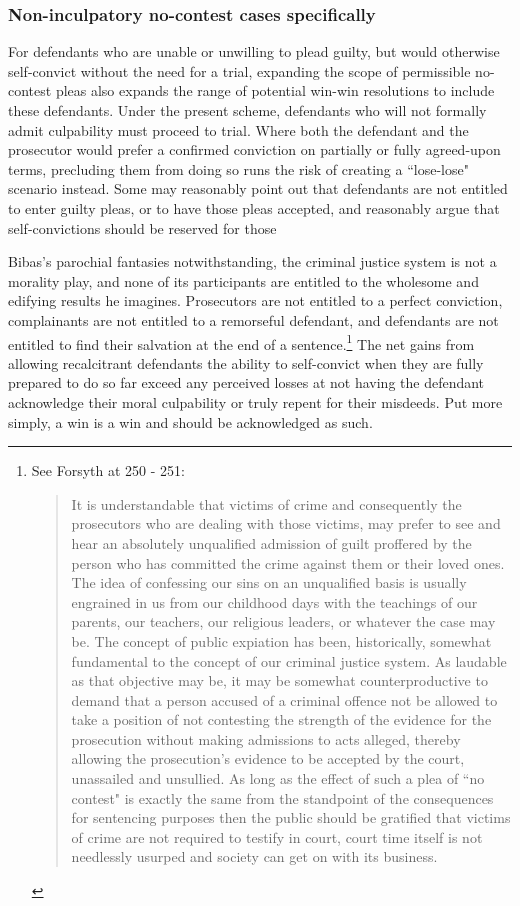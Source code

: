 \subsubsection{Non-inculpatory no-contest cases specifically}

For defendants who are unable or unwilling to plead guilty, but would otherwise self-convict without the need for a trial, expanding the scope of permissible no-contest pleas also expands the range of potential win-win resolutions to include these defendants. Under the present scheme, defendants who will not formally admit culpability must proceed to trial. Where both the defendant and the prosecutor would prefer a confirmed conviction on partially or fully agreed-upon terms, precluding them from doing so runs the risk of creating a ``lose-lose" scenario instead. Some may reasonably point out that defendants are not entitled to enter guilty pleas, or to have those pleas accepted, and reasonably argue that self-convictions should be reserved for those 

Bibas's parochial fantasies notwithstanding, the criminal justice system is not a morality play, and none of its participants are entitled to the wholesome and edifying results he imagines. Prosecutors are not entitled to a perfect conviction, complainants are not entitled to a remorseful defendant, and defendants are not entitled to find their salvation at the end of a sentence.\footnote{See Forsyth at 250 - 251: \begin{quote}
    It is understandable that victims of crime and consequently the prosecutors who are dealing with those victims, may prefer to see and hear an absolutely unqualified admission of guilt proffered by the person who has committed the crime against them or their loved ones. The idea of confessing our sins on an unqualified basis is usually engrained in us from our childhood days with the teachings of our parents, our teachers, our religious leaders, or whatever the case may be. The concept of public expiation has been, historically, somewhat fundamental to the concept of our criminal justice system. As laudable as that objective may be, it may be somewhat counterproductive to demand that a person accused of a criminal offence not be allowed to take a position of not contesting the strength of the evidence for the prosecution without making admissions to acts alleged, thereby allowing the prosecution's evidence to be accepted by the court, unassailed and unsullied. As long as the effect of such a plea of ``no contest" is exactly the same from the standpoint of the consequences for sentencing purposes then the public should be gratified that victims of crime are not required to testify in court, court time itself is not needlessly usurped and society can get on with its business.
\end{quote}} The net gains from allowing recalcitrant defendants the ability to self-convict when they are fully prepared to do so far exceed any perceived losses at not having the defendant acknowledge their moral culpability or truly repent for their misdeeds. Put more simply, a win is a win and should be acknowledged as such.


